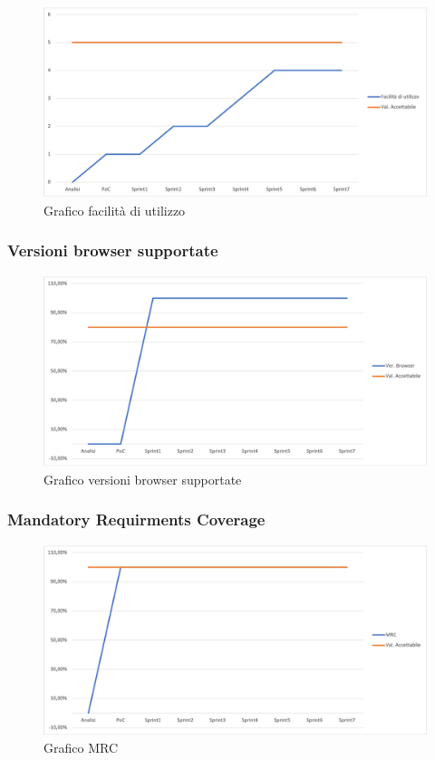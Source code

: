 \begin{figure}[H]
\centering
\includegraphics[width=1\textwidth]{src/img/facUtilizzo.png}
\caption{Grafico facilità di utilizzo}
\end{figure}

\subsubsection{Versioni browser supportate}

\begin{figure}[H]
\centering
\includegraphics[width=1\textwidth]{src/img/verBrowser.png}
\caption{Grafico versioni browser supportate}
\end{figure}

\subsubsection{Mandatory Requirments Coverage}

\begin{figure}[H]
\centering
\includegraphics[width=1\textwidth]{src/img/MRC.png}
\caption{Grafico MRC}
\end{figure}

